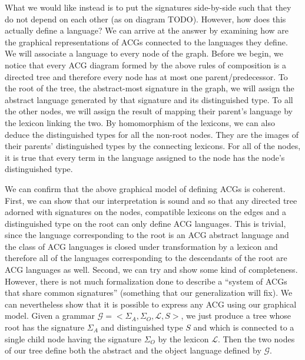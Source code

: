 What we would like instead is to put the signatures side-by-side such
that they do not depend on each other (as on diagram TODO). However, how
does this actually define a language? We can arrive at the answer by
examining how are the graphical representations of ACGs connected to the
languages they define. We will associate a language to every node of the
graph. Before we begin, we notice that every ACG diagram formed by the
above rules of composition is a directed tree and therefore every node
has at most one parent/predecessor. To the root of the tree, the
abstract-most signature in the graph, we will assign the abstract
language generated by that signature and its distinguished type. To all
the other nodes, we will assign the result of mapping their parent's
language by the lexicon linking the two. By homomorphism of the
lexicons, we can also deduce the distinguished types for all the
non-root nodes. They are the images of their parents' distinguished
types by the connecting lexicons. For all of the nodes, it is true that
every term in the language assigned to the node has the node's
distinguished type.

We can confirm that the above graphical model of defining ACGs is
coherent. First, we can show that our interpretation is sound and so
that any directed tree adorned with signatures on the nodes, compatible
lexicons on the edges and a distinguished type on the root can only
define ACG languages. This is trivial, since the language corresponding
to the root is an ACG abstract language and the class of ACG languages
is closed under transformation by a lexicon and therefore all of the
languages corresponding to the descendants of the root are ACG languages
as well. Second, we can try and show some kind of completeness. However,
there is not much formalization done to describe a ``system of ACGs that
share common signatures'' (something that our generalization will
fix). We can nevertheless show that it is possible to express any ACG
using our graphical model. Given a grammar $\mathcal{G} =
\mathopen{<}\Sigma_A, \Sigma_O, \mathcal{L}, S\mathclose{>}$, we just
produce a tree whose root has the signature $\Sigma_A$ and distinguished
type $S$ and which is connected to a single child node having the
signature $\Sigma_O$ by the lexicon $\mathcal{L}$. Then the two nodes of
our tree define both the abstract and the object language defined by
$\mathcal{G}$.

